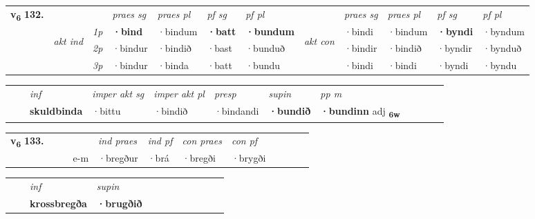 \begin{tabular}{llllllllllll} \toprule
\multirow{4}{*}{{{\textbf{v{\textsubscript{6}}} \Large{\textbf{132.}}}}}  & &   &  \textit{praes sg}  & \textit{praes pl}  &\textit{ pf sg} & \textit{pf pl} &  &  \textit{praes sg}  & \textit{praes pl}  & \textit{pf sg} & \textit{pf pl } \\*
	\cmidrule{4-7} \cmidrule{9-12}
 & \multirow{3}{*}{\begin{turn}{90}\textit{akt ind}\end{turn}} & {\textit{1p}} & \textbf{·bind} & ·bindum    & \textbf{·batt} & \textbf{·bundum} & \multirow{3}{*}{\begin{turn}{90}\textit{akt con}\end{turn}} &·bindi & ·bindum & \textbf{·byndi} & ·byndum\\*
& &  {\textit{2p}} &  ·bindur  & ·bindið   & ·bast & ·bunduð & & ·bindir & ·bindið & ·byndir & ·bynduð \\*
& &  {\textit{3p}} & ·bindur & ·binda   & ·batt & ·bundu & & ·bindi & ·bindi& ·byndi & ·byndu  \\*
\cmidrule{4-7} \cmidrule{9-12}
\end{tabular}


\begin{tabular}{llllllllllll}
 & & \textit{inf} & \textit{imper akt sg} & \textit{imper akt pl}   & \textit{presp} & \textit{supin}  & \textit{pp m}     \\*
  & & \textbf{skuldbinda} & ·bittu  & ·bindið   & ·bindandi &  \textbf{·bundið}  & \textbf{·bundinn} adj \textbf{\textsubscript{6w}} \\*
\cmidrule{1-12}
\end{tabular}





\begin{tabular}{llllllllllll}\toprule
\multirow{4}{*}{{{\textbf{v{\textsubscript{6}}} \Large{\textbf{133.}}}}}  & &  & &  \textit{ind praes} & \textit{ind pf} & \textit{con praes} & \textit{con pf} \\*
&  & & e-m & ·bregður & ·brá & ·bregði & ·brygði \\*
\cmidrule{5-9}
\end{tabular}


\begin{tabular}{llllllllllll}
 & & \textit{inf}      & \textit{supin}       \\*
  & & \textbf{krossbregða}       &  \textbf{·brugðið}   \\*
\cmidrule{1-12}
\end{tabular}



